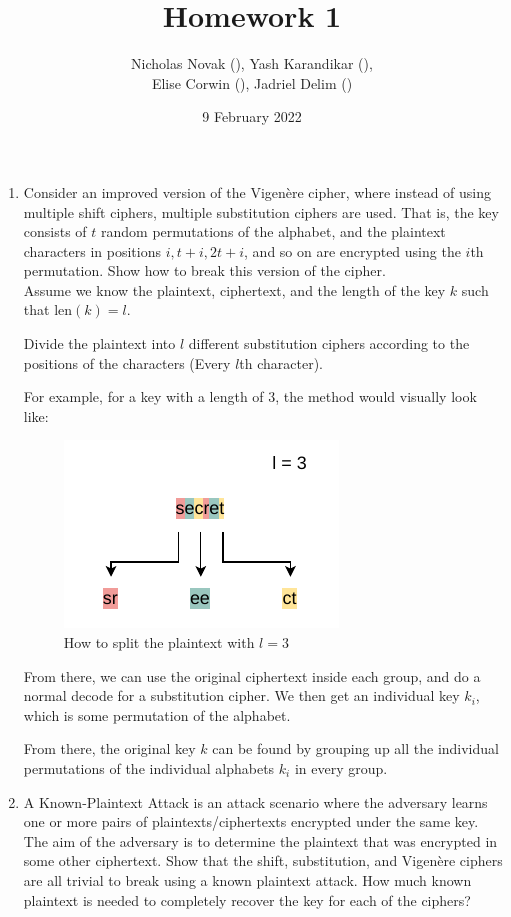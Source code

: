 \documentclass{article}
\title{Homework 1}
\date{9 February 2022}
\author{Nicholas Novak (), Yash Karandikar (),\\
Elise Corwin (), Jadriel Delim ()}
\begin{document}
\maketitle

\begin{enumerate}
  \item Consider an improved version of the Vigen\`ere cipher, where instead of
    using multiple shift ciphers, multiple substitution ciphers are used. That
    is, the key consists of $t$ random permutations of the alphabet, and the 
    plaintext characters in positions $i, t + i, 2t + i$, and so on are 
    encrypted using the $i$th permutation. Show how to break this version of 
    the cipher.\\

    Assume we know the plaintext, ciphertext, and the length of the key $k$
    such that $\text{len}(k) = l$.

    Divide the plaintext into $l$ different substitution ciphers according to
    the positions of the characters (Every $l$th character).

    For example, for a key with a length of $3$, the method would visually
    look like:
    \begin{figure}[h]
      \centering
      \caption{How to split the plaintext with $l = 3$}
      \includegraphics{improved-vigenere-split-diagram.pdf}
    \end{figure}

    From there, we can use the original ciphertext inside each group, and do a
    normal decode for a substitution cipher. We then get an individual key
    $k_i$, which is some permutation of the alphabet.

    From there, the original key $k$ can be found by grouping up all the 
    individual permutations of the individual alphabets $k_i$ in every group.


  \item A Known-Plaintext Attack is an attack scenario where the adversary 
    learns one or more pairs of plaintexts/ciphertexts encrypted under the same
    key. The aim of the adversary is to determine the plaintext that was 
    encrypted in some other ciphertext. Show that the shift, substitution, and 
    Vigen\`ere ciphers are all trivial to break using a known plaintext attack. 
    How much known plaintext is needed to completely recover the key for each
    of the ciphers?\\


\end{enumerate}
\end{document}
